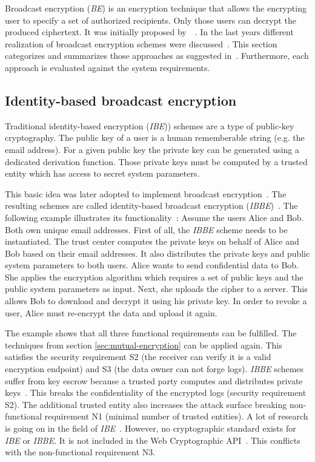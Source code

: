 \documentclass[../main.tex]{subfiles}
\begin{document}
Broadcast encryption (\emph{BE}) is an encryption technique that allows the encrypting user to specify a set of authorized recipients.
Only those users can decrypt the produced ciphertext.
It was initially proposed by~\citeauthor{fiat1993broadcast}~\cite{fiat1993broadcast}.
In the last years different realization of broadcast encryption schemes were discussed~\cite{Sakai2007, Li2018, Hagg2022, Fan2013}.
This section categorizes and summarizes those approaches as suggested in~\cite{Hagg2022}.
Furthermore, each approach is evaluated against the system requirements.

\subsection{Identity-based broadcast encryption} 
\label{sec:broadcast-identity}

Traditional identity-based encryption (\emph{IBE})) schemes are  a type of public-key cryptography.
The public key of a user is a human rememberable string (e.g. the email address).
For a given public key the private key can be generated using a dedicated derivation function.
Those private keys must be computed by a trusted entity which has access to secret system parameters.~\cite{shamir1985}

This basic idea was later adopted to implement broadcast encryption~\cite{Hagg2022}.
The resulting schemes are called identity-based broadcast encryption (\emph{IBBE})~\cite{Sakai2007}.
The following example illustrates its functionality~\cite{Hagg2022}:
Assume the users Alice and Bob.
Both own unique email addresses.
First of all, the \emph{IBBE} scheme needs to be instantiated.
The trust center computes the private keys on behalf of Alice and Bob based on their email addresses.
It also distributes the private keys and public system parameters to both users.
Alice wants to send confidential data to Bob.
She applies the encryption algorithm which requires a set of public keys and the public system parameters as input.
Next, she uploads the cipher to a server.
This allows Bob to download and decrypt it using his private key.
In order to revoke a user, Alice must re-encrypt the data and upload it again.

The example shows that all three functional requirements can be fulfilled.
The techniques from section \ref{sec:mutual-encryption} can be applied again.
This satisfies the security requirement S2 (the receiver can verify it is a valid encryption endpoint) and S3 (the data owner can not forge logs).
\emph{IBBE} schemes suffer from key escrow because a trusted party computes and distributes private keys~\cite{Hagg2022}.
This breaks the confidentiality of the encrypted logs (security requirement S2).
The additional trusted entity also increases the attack surface breaking non-functional requirement N1 (minimal number of trusted entities).
A lot of research is going on in the field of \emph{IBE}~\cite{Hagg2022}.
However, no cryptographic standard exists for \emph{IBE} or \emph{IBBE}.
It is not included in the Web Cryptographic API~\cite{WebCryptoApi2017}.
This conflicts with the non-functional requirement N3.
\end{document}
